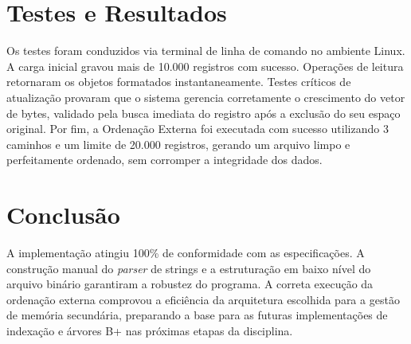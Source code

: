 \documentclass[12pt]{article}
\begin{document}
\section{Testes e Resultados}
Os testes foram conduzidos via terminal de linha de comando no ambiente Linux. A carga inicial gravou mais de 10.000 registros com sucesso. Operações de leitura retornaram os objetos formatados instantaneamente. Testes críticos de atualização provaram que o sistema gerencia corretamente o crescimento do vetor de bytes, validado pela busca imediata do registro após a exclusão do seu espaço original. Por fim, a Ordenação Externa foi executada com sucesso utilizando 3 caminhos e um limite de 20.000 registros, gerando um arquivo limpo e perfeitamente ordenado, sem corromper a integridade dos dados.

\section{Conclusão}
A implementação atingiu 100\% de conformidade com as especificações. A construção manual do \textit{parser} de strings e a estruturação em baixo nível do arquivo binário garantiram a robustez do programa. A correta execução da ordenação externa comprovou a eficiência da arquitetura escolhida para a gestão de memória secundária, preparando a base para as futuras implementações de indexação e árvores B+ nas próximas etapas da disciplina.
\end{document}
